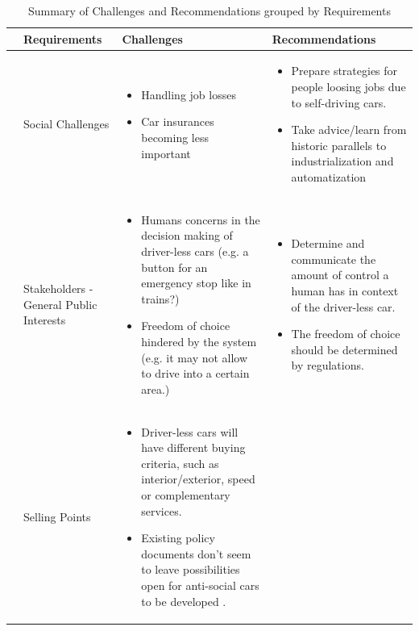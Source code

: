 			
\begin{table}
	\centering
	\caption{Summary of Challenges and Recommendations grouped by Requirements}
	\label{tab:Findings}
	\begin{small}
		\begin{supertabular}{>{}p{.02\textwidth}|>{\raggedright}p{.105\textwidth}>{\raggedright}p{.4\textwidth}>{\raggedright}p{.4\textwidth}}
			\toprule
			 & {Requirements} & {Challenges} & {Recommendations}  \tabularnewline
			\midrule
			 &Social Challenges & 
				\begin{itemize}
					\item Handling job losses
					\item Car insurances becoming less important 
				\end{itemize}         
			& 	
				\begin{itemize}
					\item Prepare strategies for people loosing jobs due to self-driving cars.
					\item Take advice/learn from historic parallels to industrialization and automatization
				\end{itemize} 
			\tabularnewline {}
			& Stakeholders - General Public Interests & 
				\begin{itemize}
					\item Humans concerns in the decision making of driver-less cars (e.g. a button for an emergency stop like in trains?)
					\item Freedom of choice hindered by the system (e.g. it may not allow to drive into a certain area.)
				\end{itemize}         
			& 
				\begin{itemize}
					\item Determine and communicate the amount of control a human has in context of the driver-less car.
					\item The freedom of choice should be determined by regulations.
				\end{itemize}         
 			 \tabularnewline {}
  			& Selling Points & 
				\begin{itemize}
					\item Driver-less cars will have different buying criteria, such as interior/exterior, speed or complementary services.
					\item Existing policy documents don't seem to leave possibilities open for anti-social cars to be developed \cite{EthicsCommission2017pr,EthicsCommission2017b,Pillath2016,NHTSA2016PolicyUpdate,DBLP:journals/corr/CharisiDFLMSSWY17}.

\end{itemize}
\end{supertabular}
\end{small}
\end{table}
